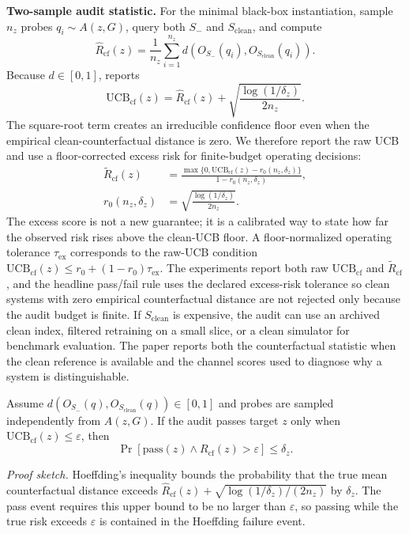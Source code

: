 \textbf{Two-sample audit statistic.}
For the minimal black-box instantiation, sample $n_z$ probes $q_i\sim A(z,G)$, query both $S_-$ and $S_{\mathrm{clean}}$, and compute
\[
\hat R_{\mathrm{cf}}(z)=\frac{1}{n_z}\sum_{i=1}^{n_z}
d(O_{S_-}(q_i),O_{S_{\mathrm{clean}}}(q_i)).
\]
Because $d\in[0,1]$, \method{} reports
\[
\mathrm{UCB}_{\mathrm{cf}}(z)=\hat R_{\mathrm{cf}}(z)+
\sqrt{\frac{\log(1/\delta_z)}{2n_z}}.
\]
The square-root term creates an irreducible confidence floor even when the empirical clean-counterfactual distance is zero. We therefore report the raw UCB and use a floor-corrected excess risk for finite-budget operating decisions:
\begin{align}
\widetilde R_{\mathrm{cf}}(z)&=
\frac{\max\{0,\mathrm{UCB}_{\mathrm{cf}}(z)-r_0(n_z,\delta_z)\}}
{1-r_0(n_z,\delta_z)}, \nonumber\\
r_0(n_z,\delta_z)&=\sqrt{\frac{\log(1/\delta_z)}{2n_z}}. \nonumber
\end{align}
The excess score is not a new guarantee; it is a calibrated way to state how far the observed risk rises above the clean-UCB floor. A floor-normalized operating tolerance $\tau_{\mathrm{ex}}$ corresponds to the raw-UCB condition $\mathrm{UCB}_{\mathrm{cf}}(z)\leq r_0+(1-r_0)\tau_{\mathrm{ex}}$. The experiments report both raw $\mathrm{UCB}_{\mathrm{cf}}$ and $\widetilde R_{\mathrm{cf}}$, and the headline pass/fail rule uses the declared excess-risk tolerance so clean systems with zero empirical counterfactual distance are not rejected only because the audit budget is finite. If $S_{\mathrm{clean}}$ is expensive, the audit can use an archived clean index, filtered retraining on a small slice, or a clean simulator for benchmark evaluation. The paper reports both the counterfactual statistic when the clean reference is available and the channel scores used to diagnose why a system is distinguishable.

\begin{proposition}
Assume $d(O_{S_-}(q),O_{S_{\mathrm{clean}}}(q))\in[0,1]$ and probes are sampled independently from $A(z,G)$. If the audit passes target $z$ only when $\mathrm{UCB}_{\mathrm{cf}}(z)\leq\varepsilon$, then
\[
\Pr[\mathrm{pass}(z)\wedge R_{\mathrm{cf}}(z)>\varepsilon]\leq \delta_z .
\]
\end{proposition}

\textit{Proof sketch.}
Hoeffding's inequality bounds the probability that the true mean counterfactual distance exceeds $\hat R_{\mathrm{cf}}(z)+\sqrt{\log(1/\delta_z)/(2n_z)}$ by $\delta_z$. The pass event requires this upper bound to be no larger than $\varepsilon$, so passing while the true risk exceeds $\varepsilon$ is contained in the Hoeffding failure event.

